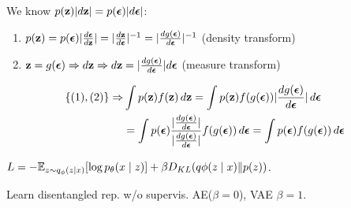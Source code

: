 \begin{definition}
    We know \(p(\vb{z}) \vert d\vb{z}\vert = p(\vb*{\epsilon})\vert d\vb*{\epsilon}\vert\):
    \begin{enumerate}
        \item \(p(\vb{z}) = p(\vb*{\epsilon})\vert\frac{d\vb*{\epsilon}}{d\vb{z}}\vert = \vert\frac{d\vb{z}}{d\vb*{\epsilon}}\vert^{-1} = \vert \frac{d g(\vb*{\epsilon})}{d\vb*{\epsilon}}\vert^{-1}\) (density transform)
        \item \(\vb{z} = g(\vb*{\epsilon}) \Rightarrow d\vb{z} \Rightarrow d\vb{z} = \vert\frac{d g(\vb*{\epsilon})}{d\vb*{\epsilon}}\vert d\vb*{\epsilon}\) (measure transform)
    \end{enumerate}
    \begin{align*}
       \{(1), (2)\} \Rightarrow &\int p(\vb{z})f(\vb{z})\, d\vb{z} = \int p(\vb{z}) f(g(\vb*{\epsilon})) \vert\frac{dg(\vb*{\epsilon})}{d\vb*{\epsilon}}\vert\, d\vb*{\epsilon}  \\
       &= \int p(\vb*{\epsilon}) \frac{\vert \frac{dg(\vb*{\epsilon})}{d\vb*{\epsilon}}\vert}{\vert \frac{dg(\vb*{\epsilon})}{d\vb*{\epsilon}}\vert} f(g(\vb*{\epsilon})) \, d\vb*{\epsilon} = \int p(\vb*{\epsilon}) f(g(\vb*{\epsilon})) \, d\vb*{\epsilon}
    \end{align*}
\end{definition}

\begin{definition}
    \(L = - \mathbb{E}_{z \sim q_\phi(z \mid x)}[\log p_\theta(x \mid z)] + \beta D_{KL}(q\phi(z \mid x)\Vert p(z))\).

    Learn disentangled rep. w/o supervis. AE(\(\beta = 0\)), VAE \(\beta = 1\).
\end{definition}

